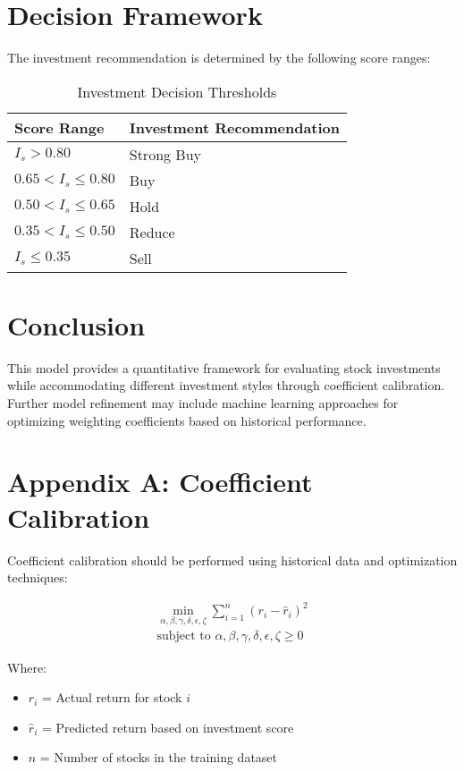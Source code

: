 \documentclass[12pt,a4paper]{article}
\begin{document}
\section{Decision Framework}
The investment recommendation is determined by the following score ranges:

\begin{table}[H]
\centering
\begin{tabular}{@{}ll@{}}
\toprule
\textbf{Score Range} & \textbf{Investment Recommendation} \\
\midrule
$I_s > 0.80$ & Strong Buy \\
$0.65 < I_s \leq 0.80$ & Buy \\
$0.50 < I_s \leq 0.65$ & Hold \\
$0.35 < I_s \leq 0.50$ & Reduce \\
$I_s \leq 0.35$ & Sell \\
\bottomrule
\end{tabular}
\caption{Investment Decision Thresholds}
\label{tab:decision}
\end{table}

\section{Conclusion}
This model provides a quantitative framework for evaluating stock investments while accommodating different investment styles through coefficient calibration. Further model refinement may include machine learning approaches for optimizing weighting coefficients based on historical performance.

\section*{Appendix A: Coefficient Calibration}
Coefficient calibration should be performed using historical data and optimization techniques:

\begin{equation}
\begin{aligned}
\min_{\alpha, \beta, \gamma, \delta, \epsilon, \zeta} \sum_{i=1}^{n} (r_i - \hat{r}_i)^2 \\
\text{subject to } \alpha, \beta, \gamma, \delta, \epsilon, \zeta \geq 0
\end{aligned}
\end{equation}

Where:
\begin{itemize}
    \item $r_i$ = Actual return for stock $i$
    \item $\hat{r}_i$ = Predicted return based on investment score
    \item $n$ = Number of stocks in the training dataset
\end{itemize}



\end{document}
